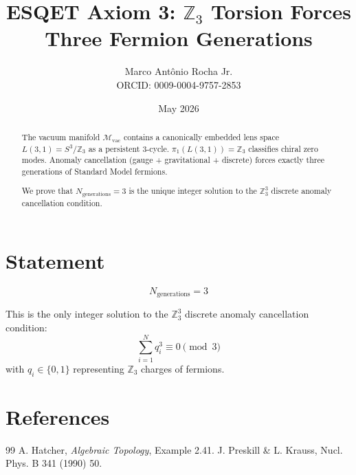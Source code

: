 \documentclass[11pt]{article}
\title{ESQET Axiom 3: $\mathbb{Z}_3$ Torsion Forces Three Fermion Generations}
\author{Marco Antônio Rocha Jr. \\ 
        ORCID: 0009-0004-9757-2853}
\date{May 2026}
\begin{document}
\maketitle

\begin{abstract}
The vacuum manifold $\mathcal{M}_{\text{vac}}$ contains a canonically embedded lens space $L(3,1) = S^3/\mathbb{Z}_3$ as a persistent 3-cycle. 
$\pi_1(L(3,1)) = \mathbb{Z}_3$ classifies chiral zero modes. 
Anomaly cancellation (gauge + gravitational + discrete) forces exactly three generations of Standard Model fermions.

We prove that $N_{\text{generations}} = 3$ is the unique integer solution to the $\mathbb{Z}_3^3$ discrete anomaly cancellation condition.
\end{abstract}

\section{Statement}

\begin{equation}
\boxed{N_{\text{generations}} = 3}
\end{equation}

This is the only integer solution to the $\mathbb{Z}_3^3$ discrete anomaly cancellation condition:
\begin{equation}
\sum_{i=1}^{N} q_i^3 \equiv 0 \pmod{3}
\end{equation}
with $q_i \in \{0,1\}$ representing $\mathbb{Z}_3$ charges of fermions.

\section{References}
\begin{thebibliography}{99}
 A. Hatcher, \emph{Algebraic Topology}, Example 2.41.
 J. Preskill \& L. Krauss, Nucl. Phys. B 341 (1990) 50.
\end{thebibliography}
\end{document}
